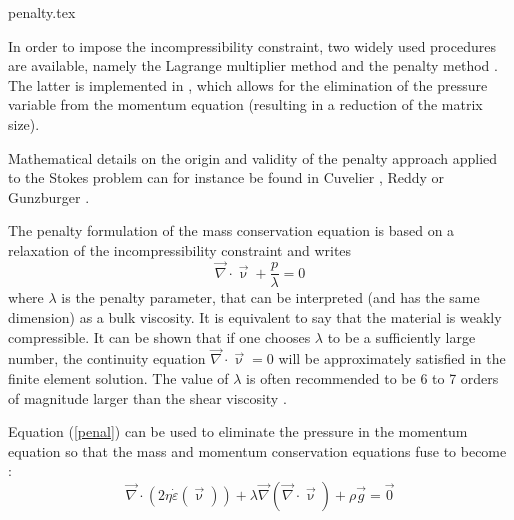 \begin{flushright} {\tiny {\color{gray} penalty.tex}} \end{flushright}

\label{sec_penalty}


In order to impose the incompressibility constraint, two widely used procedures are available, namely the 
Lagrange multiplier method and the penalty method \cite{bathe82,hugh}. The latter is implemented 
in \elefant, which allows for the elimination of the pressure variable from the momentum equation 
(resulting in a reduction of the matrix size).%

Mathematical details on the origin and validity of the penalty approach applied to the Stokes problem 
can for instance be found in  Cuvelier \etal \cite{cuss86}, Reddy \cite{redd82} or Gunzburger \cite{gunz89}.

The penalty formulation of the mass conservation equation is based on a relaxation of 
the incompressibility constraint and writes 
\begin{equation}
{\vec \nabla}\cdot {\vec \upnu} + \frac{p}{\lambda} = 0 \label{penal}
\end{equation}
where $\lambda$ is the penalty parameter, that can be interpreted (and has the same dimension) 
as a bulk viscosity. It is 
equivalent to say that the material is weakly compressible. It can be shown 
that if one chooses $\lambda$ to be a 
sufficiently large number, the continuity equation $ {\vec \nabla}\cdot {\vec \upnu} = 0$ will 
be approximately satisfied in the finite element solution. The value of $\lambda$ is often recommended 
to be 6 to 7 orders of magnitude larger than the shear viscosity \cite{dohu03,hulb79}.


Equation (\ref{penal}) can be used to eliminate the pressure in the momentum equation 
so that the mass and momentum conservation equations fuse to become :
\begin{equation}
{\vec \nabla}\cdot ( 2 \eta \dot\varepsilon({\vec \upnu})) 
+ \lambda {\vec \nabla} ({\vec \nabla }\cdot {\vec \upnu}) + \rho {\vec g} = \vec{0} \label{peneq}
\end{equation}

